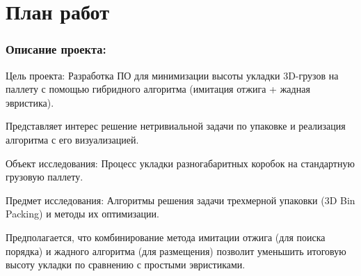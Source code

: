 \chapter{План работ}

\subsection*{Описание проекта:}
Цель проекта: Разработка ПО для минимизации высоты укладки 3D-грузов на паллету с помощью гибридного алгоритма (имитация отжига + жадная эвристика).

Представляет интерес решение нетривиальной задачи по упаковке и реализация алгоритма с его визуализацией.

Объект исследования: Процесс укладки разногабаритных коробок на стандартную грузовую паллету.

Предмет исследования: Алгоритмы решения задачи трехмерной упаковки (3D Bin Packing) и методы их оптимизации.

Предполагается, что комбинирование метода имитации отжига (для поиска порядка) и жадного алгоритма (для размещения) позволит уменьшить итоговую высоту укладки по сравнению с простыми эвристиками.

